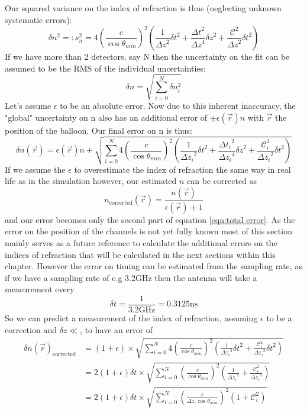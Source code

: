 \documentclass[11pt,a4paper,faculty=we,language=en,doctype=report]{cls/ugent-doc}
\begin{document}
Our squared variance on the index of refraction is thus (neglecting unknown systematic errors):
\begin{equation}
	\delta n^2 =: s_n^2 = 4\left(\frac{c}{\cos{\theta_{min}}}\right)^2 \left( \frac{1}{{\Delta z}^2}{\delta t}^2 + \frac{{\Delta t}^2}{{\Delta z}^4}{\delta z}^2 + 
\frac{\mathcal{C}^2}{{\Delta z}^2}{\delta t}^2\right)
\end{equation}
If we have more than 2 detectors, say N then the uncertainty on the fit can be assumed to be the
RMS of the individual uncertainties:
\begin{equation}
  \delta n =\sqrt{\sum_{i=0}^N \delta n _i^2}
\end{equation}
Let's assume $\epsilon$ to be an absolute error.  Now due to this inherent
inaccuracy, the "global" uncertainty on n also has an additional error of $\pm \epsilon(\vec{r})n$ with
$\vec{r}$ the position of the balloon.  Our final error on n is thus:
\begin{equation}
  \delta n(\vec{r})=  \epsilon(\vec{r})n + \sqrt{\sum_{i=0}^N 4\left(\frac{c}{\cos{\theta_{min}}}\right)^2 \left( \frac{1}{{\Delta z_i}^2}{\delta t}^2 + \frac{{\Delta t_i}^2}{{\Delta z_i}^4}{\delta z}^2 + 
  \frac{\mathcal{C}_i^2}{{\Delta z_i}^2}{\delta t}^2\right)}
  \label{eqn:total error}
\end{equation}
If we assume the $\epsilon$ to overestimate the index of refraction the same way in real
life as in the simulation however, our estimated $n$ can be corrected as
\begin{equation}
  n_{\text{corrected}} (\vec{r})= \frac{n(\vec{r})}{\epsilon(\vec{r}) + 1}
\end{equation}
and our error becomes only the second part of equation \ref{eqn:total error}.
As the error on the position of the channels is not yet fully known most of
this section mainly serves as a future reference to calculate the additional
errors on the indices of refraction that will be calculated in the next
sections within this chapter. However the error on timing can be estimated from
the sampling rate, as if we have a sampling rate of e.g 3.2GHz then the antenna
will take a measurement every 
\begin{equation}
	\delta t = \frac{1}{3.2\text{GHz}} = 0.3125\text{ns}
\end{equation}
So we can predict a measurement of the index of refraction, assuming $\epsilon$
to be a correction and $\delta z \ll$, to have an error of
\begin{align}
	\delta n(\vec{r})_{\text{corrected}}&=  (1+\epsilon)\times\sqrt{\sum_{i=0}^N 4\left(\frac{c}{\cos{\theta_{min}}}\right)^2 \left( \frac{1}{{\Delta z_i}^2}{\delta t}^2 +
  \frac{\mathcal{C}_i^2}{{\Delta z_i}^2}{\delta t}^2\right) }\\
					    &=  2(1+\epsilon){\delta t} \times\sqrt{\sum_{i=0}^N \left(\frac{c}{\cos{\theta_{min}}}\right)^2 \left( \frac{1}{{\Delta z_i}^2}+
  \frac{\mathcal{C}_i^2}{{\Delta z_i}^2}\right) }\\
					    &=  2(1+\epsilon){\delta t} \times\sqrt{\sum_{i=0}^N \left(\frac{c}{\Delta z_i\cos{\theta_{min}}}\right)^2 \left(1 +
  \mathcal{C}_i^2\right)}
  \label{eqn:errorcorr}
\end{align}
\end{document}
